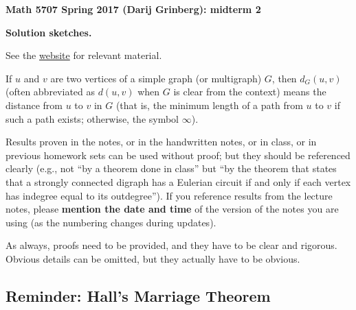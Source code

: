 \documentclass[numbers=enddot,12pt,final,onecolumn,notitlepage]{scrartcl}%
\theoremstyle{definition}
\newcommand{\tup}[1]{\left( #1 \right)}
\begin{document}
\begin{center}
\textbf{Math 5707 Spring 2017 (Darij Grinberg): midterm 2}

\textbf{Solution sketches.}
\end{center}

See the \href{http://www-users.math.umn.edu/~dgrinber/5707s17}{website} for relevant material.

If $u$ and $v$ are two vertices of a simple graph (or multigraph) $G$,
then $d_G \tup{u, v}$ (often abbreviated as $d \tup{u, v}$ when $G$
is clear from the context) means the distance from $u$ to $v$ in $G$
(that is, the minimum length of a path from $u$ to $v$ if such a path
exists; otherwise, the symbol $\infty$).

{\small Results proven in the notes, or in the handwritten notes, or in class, or in previous homework sets can be used without proof; but they should be referenced clearly (e.g., not ``by a theorem done in class'' but ``by the theorem that states that a strongly connected digraph has a Eulerian circuit if and only if each vertex has indegree equal to its outdegree'').
If you reference results from the lecture notes, please \textbf{mention the date and time} of the version of the notes you are using (as the numbering changes during updates).

As always, proofs need to be provided, and they have to be clear and rigorous. Obvious details can be omitted, but they actually have to be obvious.}


\tableofcontents

\subsection{Reminder: Hall's Marriage Theorem}
\end{document}
